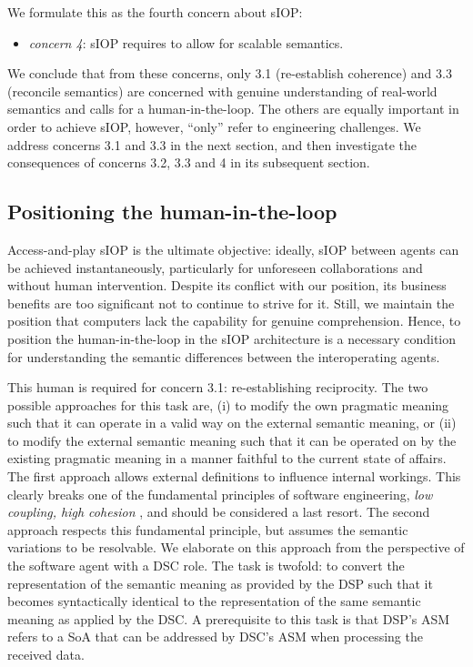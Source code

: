 \documentclass[sort&compress,preprint,authoryear,3p,twocolumn]{elsarticle}
\providecommand{\tightlist}{%
  \setlength{\itemsep}{0pt}\setlength{\parskip}{0pt}}
\begin{document}
We formulate this as the fourth concern about sIOP:

\begin{itemize}
\tightlist
\item
  \emph{concern 4}: sIOP requires to allow for scalable semantics.
\end{itemize}

We conclude that from these concerns, only 3.1 (re-establish coherence)
and 3.3 (reconcile semantics) are concerned with genuine understanding
of real-world semantics and calls for a human-in-the-loop. The others
are equally important in order to achieve sIOP, however, ``only'' refer
to engineering challenges. We address concerns 3.1 and 3.3 in the next
section, and then investigate the consequences of concerns 3.2, 3.3 and
4 in its subsequent section.

\hypertarget{positioning-the-human-in-the-loop}{%
\subsection{Positioning the
human-in-the-loop}\label{positioning-the-human-in-the-loop}}

Access-and-play sIOP is the ultimate objective: ideally, sIOP between
agents can be achieved instantaneously, particularly for unforeseen
collaborations and without human intervention. Despite its conflict with
our position, its business benefits are too significant not to continue
to strive for it. Still, we maintain the position that computers lack
the capability for genuine comprehension. Hence, to position the
human-in-the-loop in the sIOP architecture is a necessary condition for
understanding the semantic differences between the interoperating
agents.

This human is required for concern 3.1: re-establishing reciprocity. The
two possible approaches for this task are, (i) to modify the own
pragmatic meaning such that it can operate in a valid way on the
external semantic meaning, or (ii) to modify the external semantic
meaning such that it can be operated on by the existing pragmatic
meaning in a manner faithful to the current state of affairs. The first
approach allows external definitions to influence internal workings.
This clearly breaks one of the fundamental principles of software
engineering, \emph{low coupling, high cohesion}
\citep[e.g.,][]{Hitz1995}, and should be considered a last resort. The
second approach respects this fundamental principle, but assumes the
semantic variations to be resolvable. We elaborate on this approach from
the perspective of the software agent with a DSC role. The task is
twofold: to convert the representation of the semantic meaning as
provided by the DSP such that it becomes syntactically identical to the
representation of the same semantic meaning as applied by the DSC. A
prerequisite to this task is that DSP's ASM refers to a SoA that can be
addressed by DSC's ASM when processing the received data.
\end{document}
